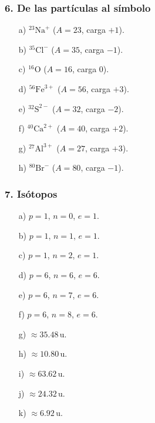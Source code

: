 \subsubsection*{6. De las partículas al símbolo}
\begin{enumerate}
    \item[a)] ${}^{23}\mathrm{Na}^{+}$ ($A=23$, carga $+1$).
    \item[b)] ${}^{35}\mathrm{Cl}^{-}$ ($A=35$, carga $-1$).
    \item[c)] ${}^{16}\mathrm{O}$ ($A=16$, carga $0$).
    \item[d)] ${}^{56}\mathrm{Fe}^{3+}$ ($A=56$, carga $+3$).
    \item[e)] ${}^{32}\mathrm{S}^{2-}$ ($A=32$, carga $-2$).
    \item[f)] ${}^{40}\mathrm{Ca}^{2+}$ ($A=40$, carga $+2$).
    \item[g)] ${}^{27}\mathrm{Al}^{3+}$ ($A=27$, carga $+3$).
    \item[h)] ${}^{80}\mathrm{Br}^{-}$ ($A=80$, carga $-1$).
\end{enumerate}

\subsubsection*{7. Isótopos}
\begin{enumerate}
    \item[a)] $p=1$, $n=0$, $e=1$.
    \item[b)] $p=1$, $n=1$, $e=1$.
    \item[c)] $p=1$, $n=2$, $e=1$.
    \item[d)] $p=6$, $n=6$, $e=6$.
    \item[e)] $p=6$, $n=7$, $e=6$.
    \item[f)] $p=6$, $n=8$, $e=6$.
    \item[g)] $\approx35.48\,\mathrm{u}$.
    \item[h)] $\approx10.80\,\mathrm{u}$.
    \item[i)] $\approx63.62\,\mathrm{u}$.
    \item[j)] $\approx24.32\,\mathrm{u}$.
    \item[k)] $\approx6.92\,\mathrm{u}$.
\end{enumerate}

